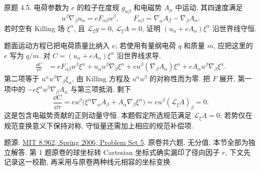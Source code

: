 \begin{exercise}
原题 4.5. 电荷参数为 $e$ 的粒子在度规 $g_{\alpha\beta}$ 和电磁势 $A_\mu$ 中运动, 其四速度满足
\[
u^\beta\nabla_\beta u_\alpha=eF_{\alpha\beta}u^\beta,
\qquad F_{\alpha\beta}=\nabla_\alpha A_\beta-\nabla_\beta A_\alpha.
\]
若时空有 Killing 场 $\xi^\alpha$, 且 $\mathcal L_\xi g=0$, $\mathcal L_\xi A=0$, 证明 $(u_\alpha+eA_\alpha)\xi^\alpha$ 沿世界线守恒.
\end{exercise}
\begin{solution}
题面运动方程已把电荷质量比纳入 $e$; 若使用有量纲电荷 $q$ 和质量 $m$, 应把这里的 $e$ 写为 $q/m$. 对 $C=(u_\alpha+eA_\alpha)\xi^\alpha$ 沿世界线求导,
\begin{align*}
\frac{\dd C}{\dd\tau}
&=eF_{\alpha\beta}u^\beta\xi^\alpha
 +u_\alpha u^\beta\nabla_\beta\xi^\alpha
 +eu^\beta(\nabla_\beta A_\alpha)\xi^\alpha
 +eA_\alpha u^\beta\nabla_\beta\xi^\alpha.
\end{align*}
第二项等于 $u^\alpha u^\beta\nabla_\beta\xi_\alpha$, 由 Killing 方程及 $u^\alpha u^\beta$ 的对称性而为零. 把 $F$ 展开, 第一项中的 $-e\xi^\alpha u^\beta\nabla_\beta A_\alpha$ 与第三项抵消. 剩下
\[
\frac{\dd C}{\dd\tau}
=eu^\beta\bigl(\xi^\alpha\nabla_\alpha A_\beta
+A_\alpha\nabla_\beta\xi^\alpha\bigr)
=eu^\beta(\mathcal L_\xi A)_\beta=0.
\]
这是包含电磁势贡献的正则动量守恒. 本题假定所选规范满足 $\mathcal L_\xi A=0$; 若势仅在规范变换意义下保持对称, 守恒量还需加上相应的规范补偿项.
\end{solution}

\label{sec:gr-ps05}

题源: \href{https://ocw.mit.edu/courses/8-962-general-relativity-spring-2020/resources/mit8_962s20_pset05/}{MIT 8.962, Spring 2006, Problem Set 5}. 原卷共六题, 无分值, 本节全部为独立解答. 第 1 题原卷的球坐标转 Cartesian 坐标式确实漏印了径向因子 $r$, 下文先记录这一校勘, 再采用与原卷两种线元相容的坐标变换.

